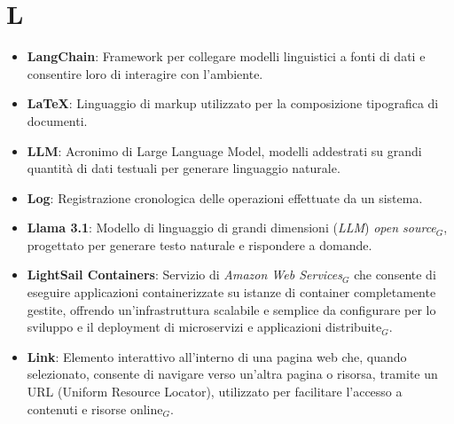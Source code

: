 \section{L}
\begin{itemize}
    \item \textbf{LangChain}: Framework per collegare modelli linguistici a fonti di dati e consentire loro di interagire con l'ambiente.
    \item \textbf{LaTeX}: Linguaggio di markup utilizzato per la composizione tipografica di documenti.
    \item \textbf{LLM}: Acronimo di Large Language Model, modelli addestrati su grandi quantità di dati testuali per generare linguaggio naturale.
    \item \textbf{Log}: Registrazione cronologica delle operazioni effettuate da un sistema.
    \item \textbf{Llama 3.1}: Modello di linguaggio di grandi dimensioni (\textit{LLM}) \textit{open source}$_G$, progettato per generare testo naturale e rispondere a domande.
    \item \textbf{LightSail Containers}: Servizio di \textit{Amazon Web Services}$_G$ che consente di eseguire applicazioni containerizzate su istanze di container completamente gestite, offrendo un'infrastruttura scalabile e semplice da configurare per lo sviluppo e il deployment di microservizi e applicazioni distribuite$_G$.
    \item \textbf{Link}: Elemento interattivo all'interno di una pagina web che, quando selezionato, consente di navigare verso un'altra pagina o risorsa, tramite un URL (Uniform Resource Locator), utilizzato per facilitare l'accesso a contenuti e risorse online$_G$.


\end{itemize}

